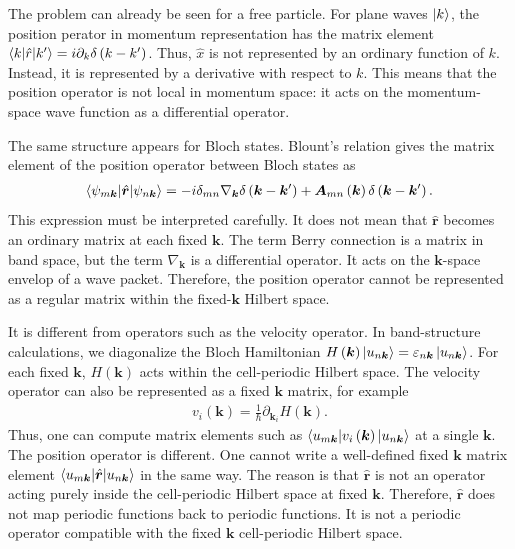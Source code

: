 \documentclass[12pt, oneside]{article}
\newcommand{\pr}{\prime}
\newcommand{\pa}{\partial}
\newcommand{\p}[1]{\left(#1\right)}
\numberwithin{equation}{subsection}
\begin{document}
The problem can already be seen for a free particle. For plane waves \(\ket{k}\), the position perator in momentum representation has the matrix element \(\braket{k | \hat{r} | k^\pr} = i \pa_k \delta \p{k - k^\pr}\). Thus, \(\hat{x}\) is not represented by an ordinary function of \(k\). Instead, it is represented by a derivative with respect to \(k\). This means that the position operator is not local in momentum space: it acts on the momentum-space wave function as a differential operator. 

The same structure appears for Bloch states. Blount's relation gives the matrix element of the position operator between Bloch states as 
\begin{align}
	\braket{\psi_{m \bm{k}} | \hat{\bm{r}} | \psi_{n \bm{k}}} = - i \delta_{mn} \nabla_{\bm{k}} \delta\p{\bm{k} - \bm{k}^\pr} + \bm{A}_{mn} \p{\bm{k}} \delta \p{\bm{k} - \bm{k}^\pr}.
\end{align}
This expression must be interpreted carefully. It does not mean that \(\hat{\bm{r}}\) becomes an ordinary matrix at each fixed \(\bm{k}\). The term Berry connection is a matrix in band space, but the term \(\nabla_{\bm{k}}\) is a differential operator. It acts on the \(\bm{k}\)-space envelop of a wave packet. Therefore, the position operator cannot be represented as a regular matrix within the fixed-\(\bm{k}\) Hilbert space.

It is different from operators such as the velocity operator. In band-structure calculations, we diagonalize the Bloch Hamiltonian \(H \p{\bm{k}} \ket{u_{n \bm{k}}} = \varepsilon_{n \bm{k}} \ket{u_{n \bm{k}}}\). For each fixed \(\bm{k}\), \(H \p{\bm{k}}\) acts within the cell-periodic Hilbert space. The velocity operator can also be represented as a fixed \(\bm{k}\) matrix, for example 
\begin{align}
	v_i \p{\bm{k}} = \frac{1}{\hbar} \pa_{\bm{k}_i} H \p{\bm{k}}.
\end{align}
Thus, one can compute matrix elements such as \(\braket{u_{m \bm{k}} | v_i \p{\bm{k}} | u_{n \bm{k}}}\) at a single \(\bm{k}\). The position operator is different. One cannot write a well-defined fixed \(\bm{k}\) matrix element \(\braket{u_{m \bm{k}} | \hat{\bm{r}} | u_{n \bm{k}}}\) in the same way. The reason is that \(\hat{\bm{r}}\) is not an operator acting purely inside the cell-periodic Hilbert space at fixed \(\bm{k}\). Therefore, \(\hat{\bm{r}}\) does not map periodic functions back to periodic functions. It is not a periodic operator compatible with the fixed \(\bm{k}\) cell-periodic Hilbert space.
\end{document}
